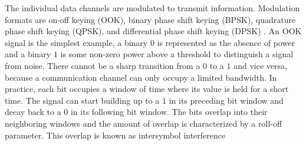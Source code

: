 
	The individual data channels are modulated to transmit information.  Modulation formats are on-off keying (OOK), binary phase shift keying (BPSK), quadrature phase shift keying (QPSK), and differential phase shift keying (DPSK) \cite{agrawal2012fiber}.  An OOK signal is the simplest example, a binary $0$ is represented as the absence of power and a binary $1$ is some non-zero power above a threshold to distinguish a signal from noise.  There cannot be a sharp transition from a $0$ to a $1$ and vice versa, because a communication channel can only occupy a limited bandwidth.  In practice, each bit occupies a window of time where its value is held for a short time.  The signal can start building up to a $1$ in its preceding bit window and decay back to a $0$ in its following bit window.  The bits overlap into their neighboring windows and the amount of overlap is characterized by a roll-off parameter.  This overlap is known as intersymbol interference
